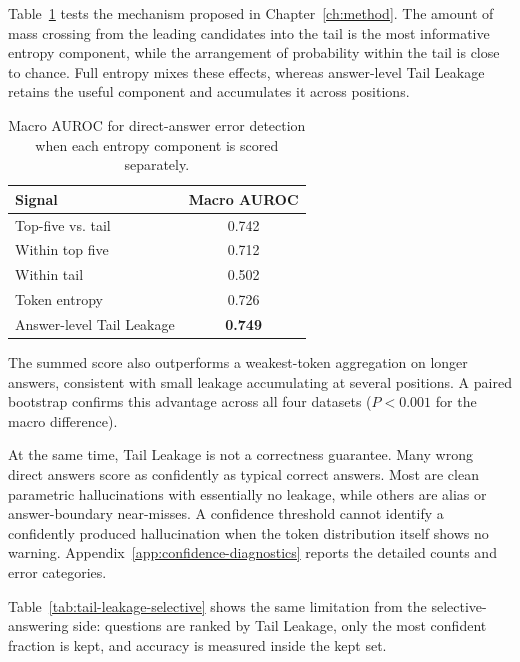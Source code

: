 \documentclass{nthu_thesis}
\begin{document}
\begin{thesiscjk}
Table~\ref{tab:entropy-components} tests the mechanism proposed in Chapter~\ref{ch:method}. The amount of mass crossing from the leading candidates into the tail is the most informative entropy component, while the arrangement of probability within the tail is close to chance. Full entropy mixes these effects, whereas answer-level Tail Leakage retains the useful component and accumulates it across positions.

\begin{table}[h]
    \centering
    \caption[Entropy Components and Tail Leakage]{Macro AUROC for direct-answer error detection when each entropy component is scored separately.}
    \label{tab:entropy-components}
    \setlength{\tabcolsep}{7pt}
    \small
    \begin{tabular}{ l c }
        \toprule
        Signal & Macro AUROC \\
        \midrule
        Top-five vs. tail & 0.742 \\
        Within top five & 0.712 \\
        Within tail & 0.502 \\
        Token entropy & 0.726 \\
        Answer-level Tail Leakage & \textbf{0.749} \\
        \bottomrule
    \end{tabular}
\end{table}

The summed score also outperforms a weakest-token aggregation on longer answers, consistent with small leakage accumulating at several positions. A paired bootstrap confirms this advantage across all four datasets ($P<0.001$ for the macro difference).

At the same time, Tail Leakage is not a correctness guarantee. Many wrong direct answers score as confidently as typical correct answers. Most are clean parametric hallucinations with essentially no leakage, while others are alias or answer-boundary near-misses. A confidence threshold cannot identify a confidently produced hallucination when the token distribution itself shows no warning. Appendix~\ref{app:confidence-diagnostics} reports the detailed counts and error categories.

Table~\ref{tab:tail-leakage-selective} shows the same limitation from the selective-answering side: questions are ranked by Tail Leakage, only the most confident fraction is kept, and accuracy is measured inside the kept set.


\end{thesiscjk}
\end{document}
